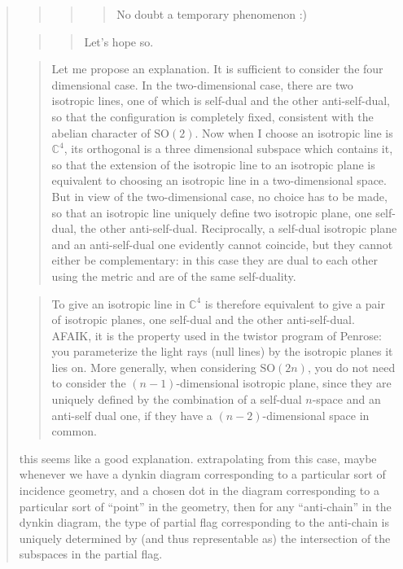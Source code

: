\documentclass{article}
\begin{document}
\begin{quote}
\begin{quote}
\begin{quote}
\begin{quote}
No doubt a temporary phenomenon :)
\end{quote}
\end{quote}
\end{quote}

\begin{quote}
\begin{quote}
Let's hope so.
\end{quote}
\end{quote}

\begin{quote}
Let me propose an explanation. It is sufficient to consider the four
dimensional case. In the two-dimensional case, there are two isotropic
lines, one of which is self-dual and the other anti-self-dual, so that
the configuration is completely fixed, consistent with the abelian
character of \(\mathrm{SO}(2)\). Now when I choose an isotropic line is
\(\mathbb{C}^4\), its orthogonal is a three dimensional subspace which
contains it, so that the extension of the isotropic line to an isotropic
plane is equivalent to choosing an isotropic line in a two-dimensional
space. But in view of the two-dimensional case, no choice has to be
made, so that an isotropic line uniquely define two isotropic plane, one
self-dual, the other anti-self-dual. Reciprocally, a self-dual isotropic
plane and an anti-self-dual one evidently cannot coincide, but they
cannot either be complementary: in this case they are dual to each other
using the metric and are of the same self-duality.
\end{quote}

\begin{quote}
To give an isotropic line in \(\mathbb{C}^4\) is therefore equivalent to
give a pair of isotropic planes, one self-dual and the other
anti-self-dual. AFAIK, it is the property used in the twistor program of
Penrose: you parameterize the light rays (null lines) by the isotropic
planes it lies on. More generally, when considering \(\mathrm{SO}(2n)\),
you do not need to consider the \((n-1)\)-dimensional isotropic plane,
since they are uniquely defined by the combination of a self-dual
\(n\)-space and an anti-self dual one, if they have a
\((n-2)\)-dimensional space in common.
\end{quote}

this seems like a good explanation. extrapolating from this case, maybe
whenever we have a dynkin diagram corresponding to a particular sort of
incidence geometry, and a chosen dot in the diagram corresponding to a
particular sort of ``point'' in the geometry, then for any
``anti-chain'' in the dynkin diagram, the type of partial flag
corresponding to the anti-chain is uniquely determined by (and thus
representable as) the intersection of the subspaces in the partial flag.


\end{quote}
\end{document}
